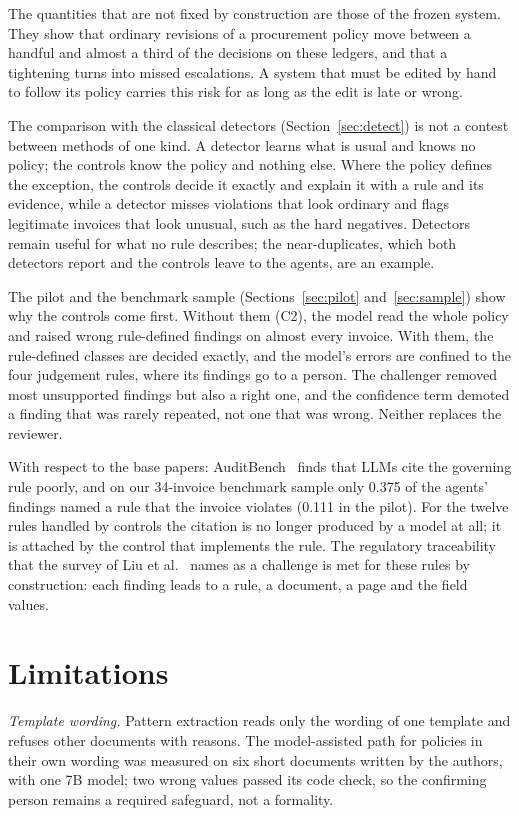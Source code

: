 \documentclass[conference]{IEEEtran}
\begin{document}
The quantities that are not fixed by construction are those of the frozen system. They show that ordinary revisions of a procurement policy move between a handful and almost a third of the decisions on these ledgers, and that a tightening turns into missed escalations. A system that must be edited by hand to follow its policy carries this risk for as long as the edit is late or wrong.

The comparison with the classical detectors (Section~\ref{sec:detect}) is not a contest between methods of one kind. A detector learns what is usual and knows no policy; the controls know the policy and nothing else. Where the policy defines the exception, the controls decide it exactly and explain it with a rule and its evidence, while a detector misses violations that look ordinary and flags legitimate invoices that look unusual, such as the hard negatives. Detectors remain useful for what no rule describes; the near-duplicates, which both detectors report and the controls leave to the agents, are an example.

The pilot and the benchmark sample (Sections~\ref{sec:pilot} and~\ref{sec:sample}) show why the controls come first. Without them (C2), the model read the whole policy and raised wrong rule-defined findings on almost every invoice. With them, the rule-defined classes are decided exactly, and the model's errors are confined to the four judgement rules, where its findings go to a person. The challenger removed most unsupported findings but also a right one, and the confidence term demoted a finding that was rarely repeated, not one that was wrong. Neither replaces the reviewer.

With respect to the base papers: AuditBench~\cite{wang2025auditbench} finds that LLMs cite the governing rule poorly, and on our 34-invoice benchmark sample only 0.375 of the agents' findings named a rule that the invoice violates (0.111 in the pilot). For the twelve rules handled by controls the citation is no longer produced by a model at all; it is attached by the control that implements the rule. The regulatory traceability that the survey of Liu et al.~\cite{liu2026survey} names as a challenge is met for these rules by construction: each finding leads to a rule, a document, a page and the field values.

\section{Limitations}
\textit{Template wording.} Pattern extraction reads only the wording of one template and refuses other documents with reasons. The model-assisted path for policies in their own wording was measured on six short documents written by the authors, with one 7B model; two wrong values passed its code check, so the confirming person remains a required safeguard, not a formality.
\end{document}
